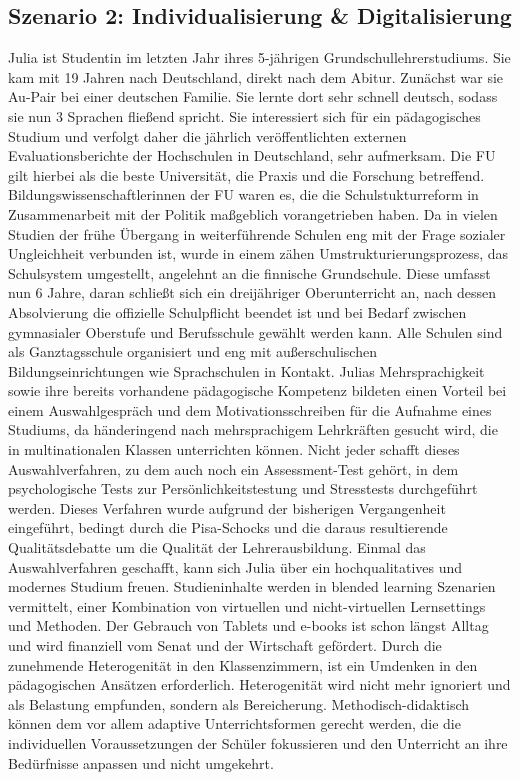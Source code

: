 \documentclass[12pt,a4paper]{article}
\begin{document}
\begin{appendix}
\section{Szenario 2: Individualisierung \& Digitalisierung}
Julia ist Studentin im letzten Jahr ihres 5-jährigen Grundschullehrerstudiums. Sie kam mit 19 Jahren nach Deutschland, direkt nach dem Abitur. Zunächst war sie Au-Pair bei einer deutschen Familie. Sie lernte dort sehr schnell deutsch, sodass sie nun 3 Sprachen fließend spricht. Sie interessiert sich für ein pädagogisches Studium und verfolgt daher die jährlich veröffentlichten externen Evaluationsberichte der Hochschulen in Deutschland, sehr aufmerksam. Die FU gilt hierbei als die beste Universität, die Praxis und die Forschung betreffend. Bildungswissenschaftlerinnen der FU waren es, die die Schulstukturreform in Zusammenarbeit mit der Politik maßgeblich vorangetrieben haben. Da in vielen Studien der frühe Übergang in weiterführende Schulen eng mit der Frage sozialer Ungleichheit verbunden ist, wurde in einem zähen Umstrukturierungsprozess, das Schulsystem umgestellt, angelehnt an die finnische Grundschule. Diese umfasst nun 6 Jahre, daran schließt sich ein dreijähriger Oberunterricht an, nach dessen Absolvierung die offizielle Schulpflicht beendet ist und bei Bedarf zwischen gymnasialer Oberstufe und Berufsschule gewählt werden kann. Alle Schulen sind als Ganztagsschule organisiert und eng mit außerschulischen Bildungseinrichtungen wie Sprachschulen in Kontakt.
Julias Mehrsprachigkeit sowie ihre bereits vorhandene pädagogische Kompetenz bildeten einen Vorteil bei einem Auswahlgespräch und dem Motivationsschreiben für die Aufnahme eines Studiums, da händeringend nach mehrsprachigem Lehrkräften gesucht wird, die in multinationalen Klassen unterrichten können. Nicht jeder schafft dieses Auswahlverfahren, zu dem auch noch ein Assessment-Test gehört, in dem psychologische Tests zur Persönlichkeitstestung und Stresstests durchgeführt werden. Dieses Verfahren wurde aufgrund der bisherigen Vergangenheit eingeführt, bedingt durch die Pisa-Schocks und die daraus resultierende Qualitätsdebatte um die Qualität der Lehrerausbildung.
Einmal das Auswahlverfahren geschafft, kann sich Julia über ein hochqualitatives und modernes Studium freuen.
Studieninhalte werden in blended learning Szenarien vermittelt, einer Kombination von virtuellen und nicht-virtuellen Lernsettings und Methoden. Der Gebrauch von Tablets und e-books ist schon längst Alltag und wird finanziell vom Senat und der Wirtschaft gefördert.
Durch die zunehmende Heterogenität in den Klassenzimmern, ist ein Umdenken in den pädagogischen Ansätzen erforderlich. Heterogenität wird nicht mehr ignoriert und als Belastung empfunden, sondern als Bereicherung. Methodisch-didaktisch können dem vor allem adaptive Unterrichtsformen gerecht werden, die die individuellen Voraussetzungen der Schüler fokussieren und den Unterricht an ihre Bedürfnisse anpassen und nicht umgekehrt.

\end{appendix}
\end{document}
